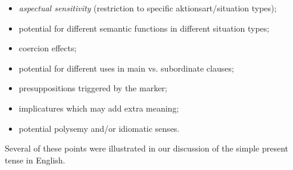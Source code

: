 \begin{itemize}
\item \textit{aspectual sensitivity} (restriction to specific aktionsart/situation types);
\item potential for different semantic functions in different situation types;
\item coercion effects;
\item potential for different uses in main vs. subordinate clauses;
\item presuppositions triggered by the marker;
\item implicatures which may add extra meaning;
\item potential polysemy and/or idiomatic senses.
\end{itemize}

Several of these points were illustrated in our discussion of the simple present tense in English.



